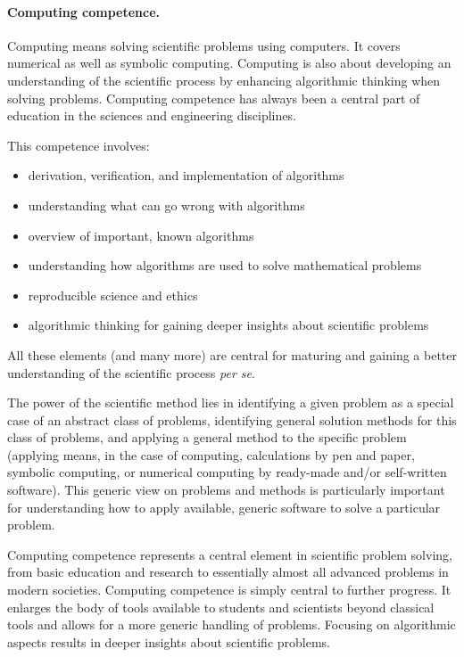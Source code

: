 \documentclass[%
oneside,                 %
final,                   %
10pt]{article}
\begin{document}
\paragraph{Computing competence.}
Computing means solving scientific problems using computers. It covers
numerical as well as symbolic computing. Computing is also about
developing an understanding of the scientific process by enhancing
algorithmic thinking when solving problems.  Computing competence has
always been a central part of education in the  sciences and engineering disciplines.

This  competence involves:

\begin{itemize}
\item derivation, verification, and implementation of algorithms

\item understanding what can go wrong with algorithms

\item overview of important, known algorithms

\item understanding how algorithms are used to solve mathematical problems

\item reproducible science and ethics

\item algorithmic thinking for gaining deeper insights about scientific problems
\end{itemize}

\noindent
All these elements (and many more) are central for  maturing and gaining a better understanding of the scientific process \emph{per se}. 

The power of the scientific method lies in identifying a given problem
as a special case of an abstract class of problems, identifying
general solution methods for this class of problems, and applying a
general method to the specific problem (applying means, in the case of
computing, calculations by pen and paper, symbolic computing, or
numerical computing by ready-made and/or self-written software). This
generic view on problems and methods is particularly important for
understanding how to apply available, generic software to solve a
particular problem.

Computing competence represents a central element
in scientific problem solving, from basic education and research to
essentially almost all advanced problems in modern
societies. Computing competence is simply central to further
progress. It enlarges the body of tools available to students and
scientists beyond classical tools and allows for a more generic
handling of problems. Focusing on algorithmic aspects results in
deeper insights about scientific problems.
\end{document}
